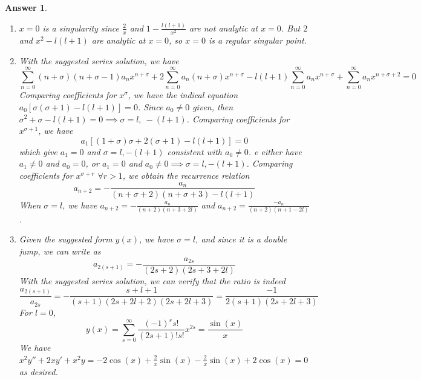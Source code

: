 \documentclass[a4paper]{article}
\newtheorem{ans}{Answer}[section]
\theoremstyle{new}
\begin{document}
\begin{ans}\leavevmode
\begin{enumerate}[label=(\roman*)]
\item $x=0$ is a singularity since $\frac{2}{x}$ and $1-\frac{l(l+1)}{x^2}$ are not analytic at $x=0$. But $2$ and $x^2-l(l+1)$ are analytic at $x=0$, so $x=0$ is a regular singular point.
\item With the suggested series solution, we have
$$\sum_{n=0}^\infty (n+\sigma)(n+\sigma-1)a_nx^{n+\sigma}+2\sum_{n=0}^\infty a_n(n+\sigma)x^{n+\sigma}-l(l+1)\sum_{n=0}^\infty a_nx^{n+\sigma}+\sum_{n=0}^\infty a_nx^{n+\sigma+2}=0$$
Comparing coefficients for $x^\sigma$, we have the indical equation $a_0[\sigma(\sigma+1)-l(l+1)]=0$. Since $a_0\neq0$ given, then  $\sigma^2+\sigma-l(l+1)=0\implies\sigma=l,~-(l+1)$. Comparing coefficients for $x^{\sigma+1}$, we have
$$a_1[(1+\sigma)\sigma+2(\sigma+1)-l(l+1)]=0$$
which give $a_1=0$ and $\sigma=l,-(l+1)$ consistent with $a_0\neq 0$. e either have $a_1\neq0$ and $a_0=0$, or $a_1=0$ and $a_0\neq0\implies \sigma=l,-(l+1)$. Comparing coefficients for $x^{\sigma+r}$ $\forall r>1$, we obtain the recurrence relation
$$a_{n+2}=-\frac{a_n}{(n+\sigma+2)(n+\sigma+3)-l(l+1)}$$
When $\sigma=l$, we have $a_{n+2}=-\frac{a_n}{(n+2)(n+3+2l)}$ and $a_{n+2}=\frac{-a_n}{(n+2)(n+1-2l)}$.
\item Given the suggested form $y(x)$, we have $\sigma=l$, and since it is a double jump, we can write as
$$a_{2(s+1)}=-\frac{a_{2s}}{(2s+2)(2s+3+2l)}$$
With the suggested series solution, we can verify that the ratio is indeed $$\frac{a_{2(s+1)}}{a_{2s}}=-\frac{s+l+1}{(s+1)(2s+2l+2)(2s+2l+3)}=\frac{-1}{2(s+1)(2s+2l+3)}$$
For $l=0$, 
$$y(x)=\sum_{s=0}^\infty\frac{(-1)^ss!}{(2s+1)!s!}x^{2s}=\frac{\sin(x)}{x}$$
We have $x^2y''+2xy'+x^2y=-2\cos(x)+\frac{2}{x}\sin(x)-\frac{2}{x}\sin(x)+2\cos(x)=0$ as desired.
\end{enumerate}
\end{ans}
\newpage
\end{document}
